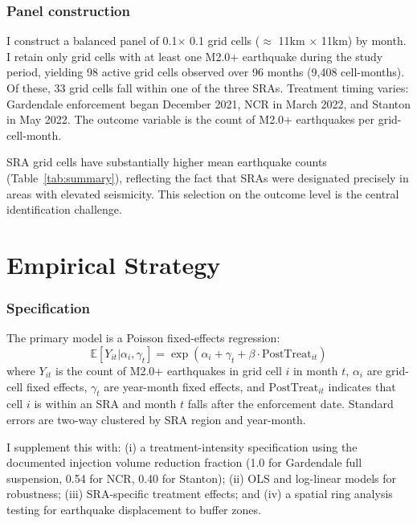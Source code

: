 \documentclass[12pt]{article}
\newcommand{\E}{\mathbb{E}}
\begin{document}
\subsubsection*{Panel construction} I construct a balanced panel of 0.1\textdegree $\times$ 0.1\textdegree{} grid cells ($\approx$ 11km $\times$ 11km) by month. I retain only grid cells with at least one M2.0+ earthquake during the study period, yielding 98 active grid cells observed over 96 months (9,408 cell-months). Of these, 33 grid cells fall within one of the three SRAs. Treatment timing varies: Gardendale enforcement began December 2021, NCR in March 2022, and Stanton in May 2022. The outcome variable is the count of M2.0+ earthquakes per grid-cell-month.



SRA grid cells have substantially higher mean earthquake counts (Table~\ref{tab:summary}), reflecting the fact that SRAs were designated precisely in areas with elevated seismicity. This selection on the outcome level is the central identification challenge.

\section{Empirical Strategy}

\subsubsection*{Specification} The primary model is a Poisson fixed-effects regression:
\begin{equation}
\E[Y_{it} | \alpha_i, \gamma_t] = \exp(\alpha_i + \gamma_t + \beta \cdot \text{PostTreat}_{it})
\end{equation}
where $Y_{it}$ is the count of M2.0+ earthquakes in grid cell $i$ in month $t$, $\alpha_i$ are grid-cell fixed effects, $\gamma_t$ are year-month fixed effects, and $\text{PostTreat}_{it}$ indicates that cell $i$ is within an SRA and month $t$ falls after the enforcement date. Standard errors are two-way clustered by SRA region and year-month.

I supplement this with: (i) a treatment-intensity specification using the documented injection volume reduction fraction (1.0 for Gardendale full suspension, 0.54 for NCR, 0.40 for Stanton); (ii) OLS and log-linear models for robustness; (iii) SRA-specific treatment effects; and (iv) a spatial ring analysis testing for earthquake displacement to buffer zones.
\end{document}
